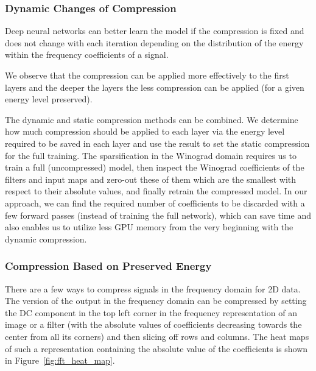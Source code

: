 \subsubsection{Dynamic Changes of Compression}

Deep neural networks can better learn the model if the compression is fixed and does not change with each iteration depending on the distribution of the energy within the frequency coefficients of a signal. %

We observe that the compression can be applied more effectively to the first layers and the deeper the layers the less compression can be applied (for a given energy level preserved).

The dynamic and static compression methods can be combined. We determine how much compression should be applied to each layer via the energy level required to be saved in each layer and use the result to set the static compression for the full training.  
The sparsification in the Winograd domain requires us to train a full (uncompressed) model, then inspect the Winograd coefficients of the filters and input maps and zero-out these of them which are the smallest with respect to their absolute values, and finally retrain the compressed model. In our approach, we can find the required number of coefficients to be discarded with a few forward passes (instead of training the full network), which can save time and also enables us to utilize less GPU memory from the very beginning with the dynamic compression. 

\subsubsection{Compression Based on Preserved Energy}

There are a few ways to compress signals in the frequency domain for 2D data. The version of the output in the frequency domain can be compressed by setting the DC component in the top left corner in the frequency representation of an image or a filter (with the absolute values of coefficients decreasing towards the center from all its corners) and then slicing off rows and columns. The heat maps of such a representation containing the absolute value of the coefficients is shown in Figure~\ref{fig:fft_heat_map}.

